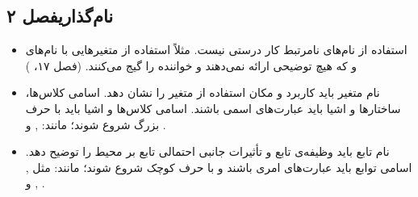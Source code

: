 \documentclass{utap}
\newcommand{\chap}[1]{\hfill\normalfont\normalsize فصل #1}
\begin{document}
\subsection[نام‌گذاری]{نام‌گذاری\chap{۲}}
\begin{itemize}
    \item
استفاده از نام‌های نامرتبط کار درستی نیست. مثلاً استفاده از متغیر‌هایی با نام‌های  و  که هیچ توضیحی ارائه نمی‌دهند و خواننده را گیج می‌کنند. (فصل ۱۷، )
    \item
نام متغیر باید کاربرد و مکان استفاده از متغیر را نشان دهد.
اسامی کلاس‌ها، ساختارها و اشیا باید عبارت‌های اسمی باشند. اسامی کلاس‌ها و اشیا باید با حرف بزرگ شروع شوند؛ مانند: ,  و .
    \item
نام تابع باید وظیفه‌ی تابع و تأثیرات جانبی احتمالی تابع بر محیط را توضیح دهد.
اسامی توابع باید عبارت‌های امری باشند و با حرف کوچک شروع شوند؛ مانند: مثل , ,  و .
\end{itemize}
\end{document}
